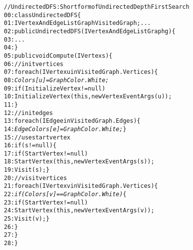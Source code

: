 \begin{figure}[t]
\begin{CodeOut}
\begin{alltt}
//UndirectedDFS: Short form of UndirectedDepthFirstSearch
00:class UndirectedDFS \{
01:\hspace*{0.1in}IVertexAndEdgeListGraph VisitedGraph; ...
02:\hspace*{0.1in}public UndirectedDFS(IVertexAndEdgeListGraph g) \{ 
03:\hspace*{0.2in}... 
04:\hspace*{0.1in}\}
05:\hspace*{0.1in}public void Compute(IVertex s) \{
06:\hspace*{0.2in}//init vertices
07:\hspace*{0.2in}foreach(IVertex u in VisitedGraph.Vertices) \{
08:\hspace*{0.3in}\emph{Colors[u]=GraphColor.White;}
09:\hspace*{0.3in}if (InitializeVertex != null)
10:\hspace*{0.3in}InitializeVertex(this, new VertexEventArgs(u));
11:\hspace*{0.2in}\}
12:\hspace*{0.2in}//init edges
13:\hspace*{0.2in}foreach(IEdge e in VisitedGraph.Edges) \{
14:\hspace*{0.3in}\emph{EdgeColors[e]=GraphColor.White;} \}
15:\hspace*{0.2in}//use start vertex			
16:\hspace*{0.2in}if (s != null) \{
17:\hspace*{0.3in}if (StartVertex != null)
18:\hspace*{0.4in}StartVertex(this,new VertexEventArgs(s));
19:\hspace*{0.3in}Visit(s); \}
20:\hspace*{0.2in}// visit vertices
21:\hspace*{0.2in}foreach(IVertex v in VisitedGraph.Vertices) \{
22:\hspace*{0.3in}\emph{if (Colors[v] == GraphColor.White)} \{
23:\hspace*{0.4in}if (StartVertex != null)
24:\hspace*{0.5in}StartVertex(this,new VertexEventArgs(v));
25:\hspace*{0.4in}Visit(v); \}
26:\hspace*{0.2in}\}
27:\hspace*{0.1in}\}
28:\}
\end{alltt}
\end{CodeOut} \vspace*{-4ex}
 \vspace*{-5ex}
\end{figure}

